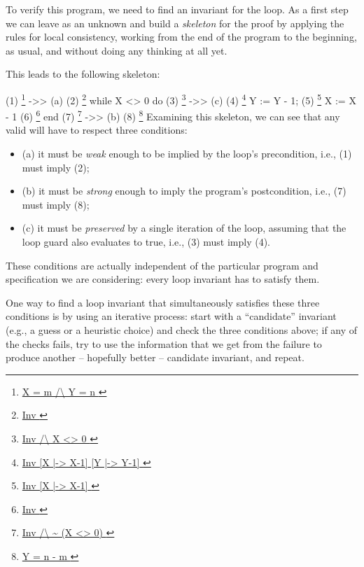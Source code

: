 \documentclass[12pt]{report}
\begin{document}
 To verify this program, we need to find an invariant  for the
    loop.  As a first step we can leave  as an unknown and build a
    \textit{skeleton} for the proof by applying the rules for local
    consistency, working from the end of the program to the beginning,
    as usual, and without doing any thinking at all yet. 

 This leads to the following skeleton:


        (1)    \footnote{\url{ X = m /\ Y = n }}  ->>                   (a)
        (2)    \footnote{\url{ Inv }}
                 while X <> 0 do
        (3)              \footnote{\url{ Inv /\ X <> 0 }}  ->>          (c)
        (4)              \footnote{\url{ Inv [X |-> X-1] [Y |-> Y-1] }}
                   Y := Y - 1;
        (5)              \footnote{\url{ Inv [X |-> X-1] }}
                   X := X - 1
        (6)              \footnote{\url{ Inv }}
                 end
        (7)    \footnote{\url{ Inv /\ ~ (X <> 0) }}  ->>                (b)
        (8)    \footnote{\url{ Y = n - m }}
 Examining this skeleton, we can see that any valid  will
    have to respect three conditions:

\begin{itemize}
\item  (a) it must be \textit{weak} enough to be implied by the loop's
      precondition, i.e., (1) must imply (2);

\item  (b) it must be \textit{strong} enough to imply the program's postcondition,
      i.e., (7) must imply (8);

\item  (c) it must be \textit{preserved} by a single iteration of the loop, assuming
      that the loop guard also evaluates to true, i.e., (3) must imply (4). 
\end{itemize}


 These conditions are actually independent of the particular
    program and specification we are considering: every loop
    invariant has to satisfy them.


    One way to find a loop invariant that simultaneously satisfies these
    three conditions is by using an iterative process: start with a
    ``candidate'' invariant (e.g., a guess or a heuristic choice) and
    check the three conditions above; if any of the checks fails, try
    to use the information that we get from the failure to produce
    another -- hopefully better -- candidate invariant, and repeat.
\end{document}

